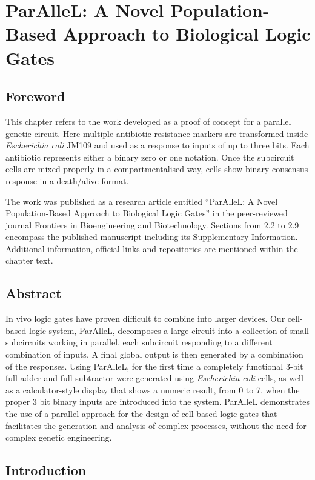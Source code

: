 \chapter{ParAlleL: A Novel Population-Based Approach to Biological Logic Gates}

\section{Foreword}

This chapter refers to the work developed as a proof of concept for a parallel genetic circuit. Here multiple antibiotic resistance markers are transformed inside \textit{Escherichia coli} JM109 and used as a response to inputs of up to three bits. Each antibiotic represents either a binary zero or one notation. Once the subcircuit cells are mixed properly in a compartmentalised way, cells show binary consensus response in a death/alive format.

The work was published as a research article entitled “ParAlleL: A Novel Population-Based Approach to Biological Logic Gates” in the peer-reviewed journal Frontiers in Bioengineering and Biotechnology. Sections from 2.2 to 2.9 encompass the published manuscript including its Supplementary Information. Additional information, official links and repositories are mentioned within the chapter text. 

\section{Abstract}

In vivo logic gates have proven difficult to combine into larger devices. Our cell-based logic system, ParAlleL, decomposes a large circuit into a collection of small subcircuits working in parallel,
each subcircuit responding to a different combination of inputs. 
A final global output is then generated by a combination of the responses. Using ParAlleL, for the first time a completely functional 3-bit full adder and full subtractor were generated using 
\textit{Escherichia coli} cells, as well as a calculator-style display that shows a numeric result, 
from 0 to 7, when the proper 3 bit binary inputs are introduced into the system. 
ParAlleL demonstrates the use of a parallel approach for the design of cell-based logic gates that facilitates 
the generation and analysis of complex processes, without the need for complex genetic engineering.

\section{Introduction}

